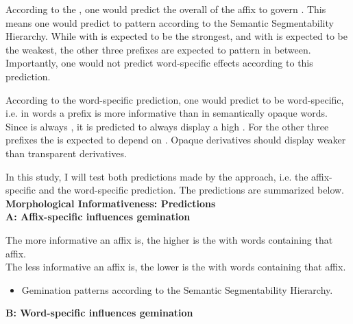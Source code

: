 {{According to the , one would predict the overall  of the affix to govern . This means one would predict  to pattern according to the Semantic Segmentability Hierarchy. While  with  is expected to be the strongest, and  with  is expected to be the weakest, the other three prefixes are expected to pattern in between. Importantly, one would not predict word-specific effects according to this prediction. 

According to the word-specific prediction, one would predict  to be word-specific, i.e. in  words a prefix is more informative than in semantically opaque words. Since  is always , it is predicted to always display a high . For the other three prefixes the  is expected to depend on . Opaque derivatives should display weaker  than transparent derivatives. 

In this study, I will test both predictions made by the  approach, i.e. the affix-specific and the word-specific prediction. The predictions are summarized below.\\


\noindent \textbf{Morphological Informativeness: Predictions}\\	

\noindent 	\textbf{A:\hspace{0.5cm} Affix-specific  influences gemination}
	
\noindent		The more informative an affix is, the higher is the  with words containing that affix. \\
		
\noindent	The less informative an affix is, the lower is the  with words 
		containing that affix. 
	
				\begin{itemize}
	\item	Gemination patterns according to the Semantic Segmentability Hierarchy. 		\\
		

\end{itemize}


	
\noindent	\textbf{B: \hspace{0.5cm} Word-specific  influences gemination}
	
}}
